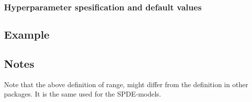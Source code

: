 \documentclass[a4paper,11pt]{article}
\begin{document}
\subsubsection*{Hyperparameter spesification and default values}



\subsection*{Example}



\subsection*{Notes}

Note that the above definition of range, might differ from the
definition in other packages. It is the same used for the SPDE-models.
\end{document}
